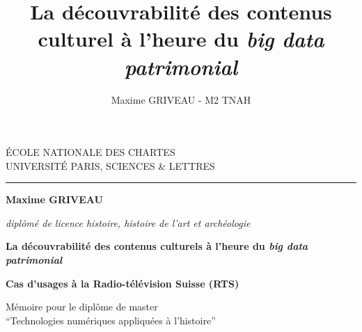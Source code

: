 \documentclass[a4paper,12pt,twoside]{book}
\author{Maxime GRIVEAU - M2 TNAH}
\title{La découvrabilité des contenus culturel à l'heure du \textit{big data patrimonial}}
\begin{document}
	\begin{titlepage}
		\begin{center}
			
			\bigskip
			
			\begin{large}				
				ÉCOLE NATIONALE DES CHARTES\\
				UNIVERSITÉ PARIS, SCIENCES \& LETTRES
			\end{large}
			\begin{center}\rule{2cm}{0.02cm}\end{center}
			
			\bigskip
			\bigskip
			\bigskip
			\begin{Large}
				\textbf{Maxime GRIVEAU}\\
			\end{Large}
			\begin{normalsize} 
				\textit{diplômé de licence histoire, histoire de l'art et archéologie}
			\end{normalsize}
			
			\bigskip
			\bigskip
			\bigskip
			
			\begin{Huge}
				\textbf{La découvrabilité des contenus culturels à l'heure du \textit{big data patrimonial}}\\
			\end{Huge}
			\bigskip
			\bigskip
			\begin{LARGE}
				\textbf{Cas d'usages à la Radio-télévision Suisse (RTS)}\\
			\end{LARGE}
			
			\bigskip
			\bigskip
			\bigskip
			\begin{large}
			\end{large}
			\vfill
			
			\begin{large}
				Mémoire 
				pour le diplôme de master \\
				\enquote{Technologies numériques appliquées à l'histoire} \\
			\end{large}
			
		\end{center}
	\end{titlepage}
	
	\thispagestyle{empty}	
	\cleardoublepage
	
	\frontmatter
	
\end{document}
